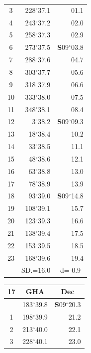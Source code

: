 \documentclass[10pt, a4paper]{report}
\begin{document}
\begin{scriptsize}
\begin{tabular*}{0.2\textwidth}[t]{@{\extracolsep{\fill}}|c|rr|}
3 & 228$^\circ$37.1 & \raisebox{0.24ex}{\boldmath$\cdot$~\boldmath$\cdot$~~}01.1\\
4 & 243$^\circ$37.2 & 02.0\\
5 & 258$^\circ$37.3 & 02.9\\[2Pt]
6 & 273$^\circ$37.5 & \textbf{S}09$^\circ$03.8\\
7 & 288$^\circ$37.6 & 04.7\\
8 & 303$^\circ$37.7 & 05.6\\
9 & 318$^\circ$37.9 & \raisebox{0.24ex}{\boldmath$\cdot$~\boldmath$\cdot$~~}06.6\\
10 & 333$^\circ$38.0 & 07.5\\
11 & 348$^\circ$38.1 & 08.4\\[2Pt]
12 & 3$^\circ$38.2 & \textbf{S}09$^\circ$09.3\\
13 & 18$^\circ$38.4 & 10.2\\
14 & 33$^\circ$38.5 & 11.1\\
15 & 48$^\circ$38.6 & \raisebox{0.24ex}{\boldmath$\cdot$~\boldmath$\cdot$~~}12.1\\
16 & 63$^\circ$38.8 & 13.0\\
17 & 78$^\circ$38.9 & 13.9\\[2Pt]
18 & 93$^\circ$39.0 & \textbf{S}09$^\circ$14.8\\
19 & 108$^\circ$39.1 & 15.7\\
20 & 123$^\circ$39.3 & 16.6\\
21 & 138$^\circ$39.4 & \raisebox{0.24ex}{\boldmath$\cdot$~\boldmath$\cdot$~~}17.5\\
22 & 153$^\circ$39.5 & 18.5\\
23 & 168$^\circ$39.6 & 19.4\\
\hline
\rule{0pt}{2.4ex} & \multicolumn{1}{c}{SD.=16.0} & \multicolumn{1}{c|}{d=-0.9}\\
\hline
\end{tabular*}\noindent
\begin{tabular*}{0.2\textwidth}[t]{@{\extracolsep{\fill}}|c|rr|}
\hline
\multicolumn{1}{|c|}{\rule{0pt}{2.6ex}\textbf{17}} & \multicolumn{1}{c}{\textbf{GHA}} & \multicolumn{1}{c|}{\textbf{Dec}}\\
\hline\rule{0pt}{2.6ex}\noindent
0 & 183$^\circ$39.8 & \textbf{S}09$^\circ$20.3\\
1 & 198$^\circ$39.9 & 21.2\\
2 & 213$^\circ$40.0 & 22.1\\
3 & 228$^\circ$40.1 & \raisebox{0.24ex}{\boldmath$\cdot$~\boldmath$\cdot$~~}23.0\\

\end{tabular*}
\end{scriptsize}
\end{document}
